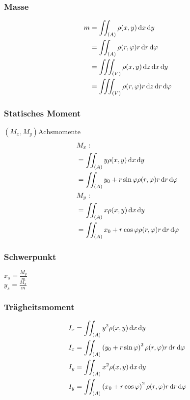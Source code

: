 \newpage
\begin{multicols}{2}
\subsubsection*{Masse}
\begin{align*}
m&=\iint_{(A)}\rho(x,y)\diff x\diff y\\
 &=\iint_{(A)}\rho(r,\varphi)r\diff r\diff \varphi\\
 &=\iiint_{(V)}\rho(x,y)\diff z\diff x\diff y\\
 &=\iiint_{(V)}\rho(r,\varphi)r\diff z\diff r\diff \varphi
\end{align*}
\vfill
\subsubsection*{Statisches Moment}
\( \left( M_x, M_y \right) \text{Achsmomente}\)
\begin{align*}
&M_x: \\
&=\iint_{(A)}y\rho(x,y)\diff x\diff y\\
&=\iint_{(A)}y_0+r\sin\varphi\rho(r,\varphi)r\diff r\diff \varphi\\
&M_y: \\
&=\iint_{(A)}x\rho(x,y)\diff x\diff y\\
&=\iint_{(A)}x_0+r\cos\varphi\rho(r,\varphi)r\diff r\diff \varphi
\end{align*}
\end{multicols}

\subsubsection*{Schwerpunkt}
\begin{multicols}{2}
 \(x_s=\frac{M_y}{m}\)\\
 \(y_s=\frac{M_x}{m}\)
\end{multicols}

\subsubsection*{Trägheitsmoment}
\begin{align*}
I_x&=\iint_{(A)}y^2\rho(x,y)\diff x\diff y\\
I_x&=\iint_{(A)}\left(y_0+r\sin\varphi\right)^2\rho(r,\varphi)r\diff r\diff \varphi\\
I_y&=\iint_{(A)}x^2\rho(x,y)\diff x\diff y\\
I_y&=\iint_{(A)}\left(x_0+r\cos\varphi\right)^2\rho(r,\varphi)r\diff r\diff \varphi
\end{align*}

